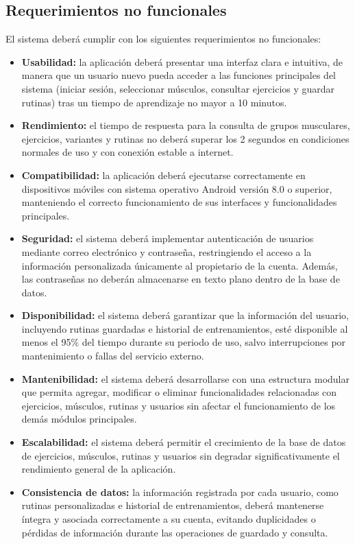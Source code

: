 \subsection{Requerimientos no funcionales}

El sistema deberá cumplir con los siguientes requerimientos no funcionales:

\begin{itemize}
    \item \textbf{Usabilidad:} la aplicación deberá presentar una interfaz clara e intuitiva, de manera que un usuario nuevo pueda acceder a las funciones principales del sistema (iniciar sesión, seleccionar músculos, consultar ejercicios y guardar rutinas) tras un tiempo de aprendizaje no mayor a 10 minutos.
    
    \item \textbf{Rendimiento:} el tiempo de respuesta para la consulta de grupos musculares, ejercicios, variantes y rutinas no deberá superar los 2 segundos en condiciones normales de uso y con conexión estable a internet.
    
    \item \textbf{Compatibilidad:} la aplicación deberá ejecutarse correctamente en dispositivos móviles con sistema operativo Android versión 8.0 o superior, manteniendo el correcto funcionamiento de sus interfaces y funcionalidades principales.
    
    \item \textbf{Seguridad:} el sistema deberá implementar autenticación de usuarios mediante correo electrónico y contraseña, restringiendo el acceso a la información personalizada únicamente al propietario de la cuenta. Además, las contraseñas no deberán almacenarse en texto plano dentro de la base de datos.
    
    \item \textbf{Disponibilidad:} el sistema deberá garantizar que la información del usuario, incluyendo rutinas guardadas e historial de entrenamientos, esté disponible al menos el 95\% del tiempo durante su periodo de uso, salvo interrupciones por mantenimiento o fallas del servicio externo.
    
    \item \textbf{Mantenibilidad:} el sistema deberá desarrollarse con una estructura modular que permita agregar, modificar o eliminar funcionalidades relacionadas con ejercicios, músculos, rutinas y usuarios sin afectar el funcionamiento de los demás módulos principales.
    
    \item \textbf{Escalabilidad:} el sistema deberá permitir el crecimiento de la base de datos de ejercicios, músculos, rutinas y usuarios sin degradar significativamente el rendimiento general de la aplicación.
    
    \item \textbf{Consistencia de datos:} la información registrada por cada usuario, como rutinas personalizadas e historial de entrenamientos, deberá mantenerse íntegra y asociada correctamente a su cuenta, evitando duplicidades o pérdidas de información durante las operaciones de guardado y consulta.
\end{itemize}
